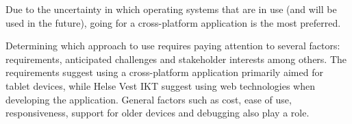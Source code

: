 Due to the uncertainty in which operating systems that are in use (and will be used in the future), going for a cross-platform application is the most preferred. 






Determining which approach to use requires paying attention to several factors: requirements, anticipated challenges and stakeholder interests among others. The requirements suggest using a cross-platform application primarily aimed for tablet devices, while Helse Vest IKT suggest using web technologies when developing the application. General factors such as cost, ease of use, responsiveness, support for older devices and debugging also play a role.

